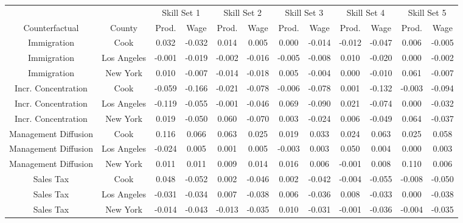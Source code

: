 
\centering
\begin{tabular}[t]{cccccccccccc}
\toprule
\multicolumn{1}{c}{ } & \multicolumn{1}{c}{ } & \multicolumn{2}{c}{Skill Set 1} & \multicolumn{2}{c}{Skill Set 2} & \multicolumn{2}{c}{Skill Set 3} & \multicolumn{2}{c}{Skill Set 4} & \multicolumn{2}{c}{Skill Set 5} \\
\cmidrule(l{3pt}r{3pt}){3-4} \cmidrule(l{3pt}r{3pt}){5-6} \cmidrule(l{3pt}r{3pt}){7-8} \cmidrule(l{3pt}r{3pt}){9-10} \cmidrule(l{3pt}r{3pt}){11-12}
Counterfactual & County & Prod. & Wage & Prod. & Wage & Prod. & Wage & Prod. & Wage & Prod. & Wage\\
\midrule
Immigration & Cook & 0.032 & -0.032 & 0.014 & 0.005 & 0.000 & -0.014 & -0.012 & -0.047 & 0.006 & -0.005\\
Immigration & Los Angeles & -0.001 & -0.019 & -0.002 & -0.016 & -0.005 & -0.008 & 0.010 & -0.020 & 0.000 & -0.002\\
Immigration & New York & 0.010 & -0.007 & -0.014 & -0.018 & 0.005 & -0.004 & 0.000 & -0.010 & 0.061 & -0.007\\
Incr. Concentration & Cook & -0.059 & -0.166 & -0.021 & -0.078 & -0.006 & -0.078 & 0.001 & -0.132 & -0.003 & -0.094\\
Incr. Concentration & Los Angeles & -0.119 & -0.055 & -0.001 & -0.046 & 0.069 & -0.090 & 0.021 & -0.074 & 0.000 & -0.032\\
Incr. Concentration & New York & 0.019 & -0.050 & 0.060 & -0.070 & 0.003 & -0.024 & 0.006 & -0.049 & 0.064 & -0.037\\
Management Diffusion & Cook & 0.116 & 0.066 & 0.063 & 0.025 & 0.019 & 0.033 & 0.024 & 0.063 & 0.025 & 0.058\\
Management Diffusion & Los Angeles & -0.024 & 0.005 & 0.001 & 0.005 & -0.003 & 0.003 & 0.050 & 0.004 & 0.000 & 0.003\\
Management Diffusion & New York & 0.011 & 0.011 & 0.009 & 0.014 & 0.016 & 0.006 & -0.001 & 0.008 & 0.110 & 0.006\\
Sales Tax & Cook & 0.048 & -0.052 & 0.002 & -0.046 & 0.002 & -0.042 & -0.004 & -0.055 & -0.008 & -0.050\\
Sales Tax & Los Angeles & -0.031 & -0.034 & 0.007 & -0.038 & 0.006 & -0.036 & 0.008 & -0.033 & 0.000 & -0.038\\
Sales Tax & New York & -0.014 & -0.043 & -0.013 & -0.035 & 0.010 & -0.031 & -0.001 & -0.036 & -0.004 & -0.035\\
\bottomrule
\end{tabular}